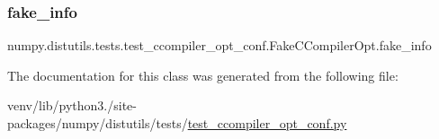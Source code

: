 \subsubsection{\texorpdfstring{fake\+\_\+info}{fake\_info}}
{\footnotesize\ttfamily numpy.\+distutils.\+tests.\+test\+\_\+ccompiler\+\_\+opt\+\_\+conf.\+Fake\+C\+Compiler\+Opt.\+fake\+\_\+info\hspace{0.3cm}{\ttfamily [static]}}



The documentation for this class was generated from the following file\+:\begin{DoxyCompactItemize}
\item 
venv/lib/python3./site-\/packages/numpy/distutils/tests/\hyperlink{test__ccompiler__opt__conf_8py}{test\+\_\+ccompiler\+\_\+opt\+\_\+conf.\+py}\end{DoxyCompactItemize}
